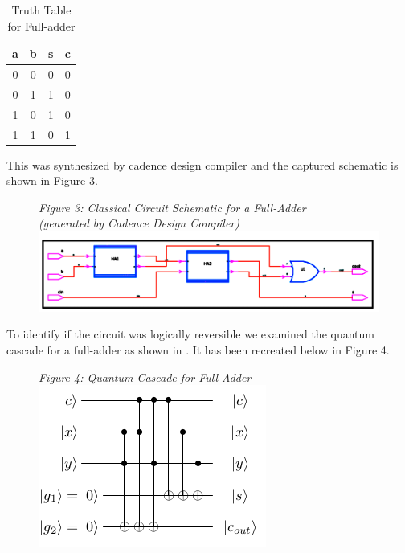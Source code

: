 \documentclass{IEEEtran}
\begin{document}
\begin{table}[h!]
\caption{Truth Table for Full-adder}
\begin{center}
\begin{tabular}{| c  c | c  c |}
    \hline
    a&b&s&c \\
    \hline
    \hline
    0&0&0&0 \\
    0&1&1&0 \\
    1&0&1&0 \\
    1&1&0&1 \\ 
    \hline
\end{tabular}
\end{center}

\end{table}

This was synthesized by cadence design compiler and the captured schematic is shown in Figure 3. 

\begin{figure}[h!]
\begin{center}
\textit{\small{\label{fig:cfa}Figure 3: Classical Circuit Schematic for a Full-Adder \\ (generated by Cadence Design Compiler)}}
  \includegraphics[scale=0.2]{figures/full-adder_schematic.PNG}
\end{center}
\end{figure}

To identify if the circuit was logically reversible we examined the quantum cascade for a full-adder as shown in \cite{qcagi}. It has been recreated below in Figure 4.

\begin{figure}[H]
\begin{center}
\textit{\small{\label{fig:qfa}Figure 4: Quantum Cascade for Full-Adder}} 
  \includegraphics[scale=0.6]{figures/Full_adder_qc.png}
\end{center}
\end{figure}
\end{document}

